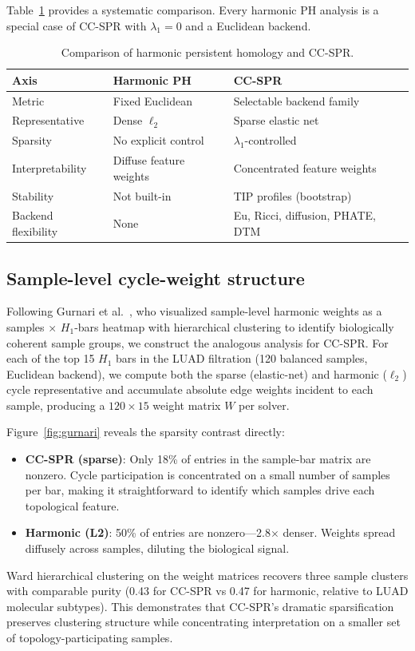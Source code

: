 \documentclass[11pt]{article}
\begin{document}
Table~\ref{tab:hphcompare} provides a systematic comparison.
Every harmonic PH analysis is a special case of CC-SPR with $\lambda_1 = 0$ and a Euclidean backend.

\begin{table}[h]
\centering
\small
\begin{tabular}{p{2.5cm}p{3.0cm}p{3.0cm}}
\toprule
\textbf{Axis} & \textbf{Harmonic PH} & \textbf{CC-SPR} \\
\midrule
Metric & Fixed Euclidean & Selectable backend family \\
Representative & Dense $\ell_2$ & Sparse elastic net \\
Sparsity & No explicit control & $\lambda_1$-controlled \\
Interpretability & Diffuse feature weights & Concentrated feature weights \\
Stability & Not built-in & TIP profiles (bootstrap) \\
Backend flexibility & None & Eu, Ricci, diffusion, PHATE, DTM \\
\bottomrule
\end{tabular}
\caption{Comparison of harmonic persistent homology and CC-SPR.}
\label{tab:hphcompare}
\end{table}

\subsection{Sample-level cycle-weight structure}
\label{sec:cycleweight}

Following Gurnari et al.\ \cite{harmonicPH}, who visualized sample-level harmonic weights as a samples $\times$ $H_1$-bars heatmap with hierarchical clustering to identify biologically coherent sample groups, we construct the analogous analysis for CC-SPR.
For each of the top 15 $H_1$ bars in the LUAD filtration (120 balanced samples, Euclidean backend), we compute both the sparse (elastic-net) and harmonic ($\ell_2$) cycle representative and accumulate absolute edge weights incident to each sample, producing a $120 \times 15$ weight matrix $W$ per solver.

Figure~\ref{fig:gurnari} reveals the sparsity contrast directly:
\begin{itemize}[leftmargin=1.5em]
\item \textbf{CC-SPR (sparse)}: Only 18\% of entries in the sample-bar matrix are nonzero. Cycle participation is concentrated on a small number of samples per bar, making it straightforward to identify which samples drive each topological feature.
\item \textbf{Harmonic (L2)}: 50\% of entries are nonzero---2.8$\times$ denser. Weights spread diffusely across samples, diluting the biological signal.
\end{itemize}
Ward hierarchical clustering on the weight matrices recovers three sample clusters with comparable purity (0.43 for CC-SPR vs 0.47 for harmonic, relative to LUAD molecular subtypes).
This demonstrates that CC-SPR's dramatic sparsification preserves clustering structure while concentrating interpretation on a smaller set of topology-participating samples.
\end{document}
